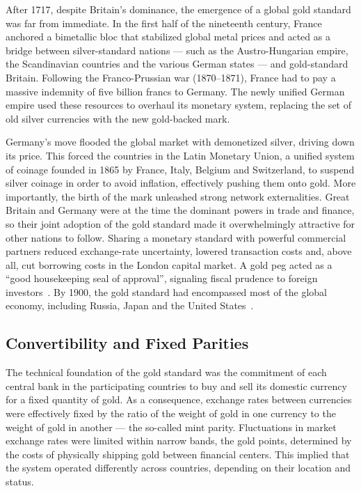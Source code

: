 After 1717, despite Britain's dominance, the emergence of a global gold standard was far from immediate. In the first half of the nineteenth century, France anchored a bimetallic bloc that stabilized global metal prices and acted as a bridge between silver-standard nations --- such as the Austro-Hungarian empire, the Scandinavian countries and the various German states --- and gold-standard Britain. Following the Franco-Prussian war (1870–1871), France had to pay a massive indemnity of five billion francs to Germany. The newly unified German empire used these resources to overhaul its monetary system, replacing the set of old silver currencies with the new gold-backed mark.
 
Germany's move flooded the global market with demonetized silver, driving down its price. This forced the countries in the Latin Monetary Union, a unified system of coinage founded in 1865 by France, Italy, Belgium and Switzerland, to suspend silver coinage in order to avoid inflation, effectively pushing them onto gold. More importantly, the birth of the mark unleashed strong network externalities. Great Britain and Germany were at the time the dominant powers in trade and finance, so their joint adoption of the gold standard made it overwhelmingly attractive for other nations to follow. Sharing a monetary standard with powerful commercial partners reduced exchange-rate uncertainty, lowered transaction costs and, above all, cut borrowing costs in the London capital market. A gold peg acted as a ``good housekeeping seal of approval'', signaling fiscal prudence to foreign investors~\cite{BordoRockoff1996}. By 1900, the gold standard had encompassed most of the global economy, including Russia, Japan and the United States~\cite{Eichengreen1996}.
\subsection{Convertibility and Fixed Parities}
The technical foundation of the gold standard was the commitment of each central bank in the participating countries to buy and sell its domestic currency for a fixed quantity of gold. As a consequence, exchange rates between currencies were effectively fixed by the ratio of the weight of gold in one currency to the weight of gold in another --- the so-called mint parity. Fluctuations in market exchange rates were limited within narrow bands, the gold points, determined by the costs of physically shipping gold between financial centers. This implied that the system operated differently across countries, depending on their location and status.
 
